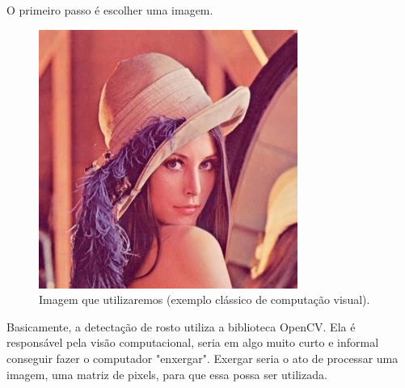 \documentclass[12pt]{article}
\begin{document}
	O primeiro passo é escolher uma imagem.
		\begin{figure}[ht!]
		\centering
		\includegraphics[width=\textwidth]{lena}
		\caption{Imagem que utilizaremos (exemplo clássico de computação visual).}
	\end{figure}
	
	Basicamente, a detectação de rosto utiliza a biblioteca OpenCV. Ela é responsável pela visão computacional, seria em algo muito curto e informal conseguir fazer o computador "enxergar". Exergar seria o ato de processar uma imagem, uma matriz de pixels, para que essa possa ser utilizada.
	
\end{document}
